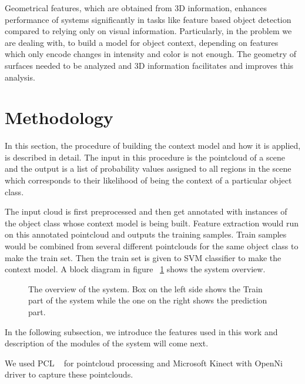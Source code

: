 Geometrical features, which are obtained from 3D information, enhances performance of systems significantly in tasks like feature 
based object detection compared to relying only on visual information. 
Particularly, in the problem we are dealing with, to build a model for object context, depending on features which only encode 
changes in intensity and color is not enough. The geometry of surfaces needed to be analyzed and 3D information facilitates and improves this analysis.


\section{Methodology}
\label{Implementation.sec}

In this section, the procedure of building the context model and how it is applied, is described in detail. 
The input in this procedure is the pointcloud of a scene and the output is a list of probability values assigned to all regions in
the scene which corresponds to their likelihood of being the context of a particular object class. 


The input cloud is first preprocessed and then get annotated with instances of the object class whose context model is being built. 
Feature extraction would run on this annotated pointcloud and outputs the training samples. 
Train samples would be combined from several different pointclouds for the same object class to make the train set. 
Then the train set is given to SVM classifier to make the context model. A block diagram in figure ~\ref{SystemOverview.figure} shows 
the system overview.

\begin{figure}[t]
  \caption[System Overview]
  {The overview of the system. Box on the left side shows the Train part of the system while the one on the right shows the prediction part.}
  \label{SystemOverview.figure}
\end{figure}

In the following subsection, we introduce the features used in this work and description of the modules of the system 
will come next.

We used PCL ~\cite{Rusu_ICRA2011_PCL} for pointcloud processing and Microsoft Kinect with OpenNi driver to capture these pointclouds.

